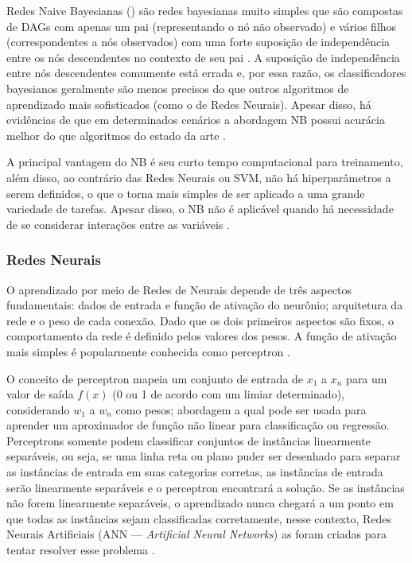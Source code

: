 \documentclass[
	12pt,				%
	oneside,			%
	a4paper,			%
	english,			%
	brazil				%
	]{abntex2ppgsi}
\begin{document}
{Redes Naive Bayesianas () são redes bayesianas muito simples que são compostas de DAGs com apenas um pai (representando o nó não observado) e vários filhos (correspondentes a nós observados) com uma forte suposição de independência entre os nós descendentes no contexto de seu pai \cite{kotsiantis2006machine}.  A suposição de independência entre nós descendentes comumente está errada e, por essa razão, os classificadores bayesianos geralmente são menos precisos do que outros algoritmos de aprendizado mais sofisticados (como o de Redes Neurais). Apesar disso, há evidências de que em determinados cenários a abordagem NB possui acurácia melhor do que algoritmos do estado da arte \cite{kotsiantis2006machine}.

A principal vantagem do NB é seu curto tempo computacional para treinamento, além disso, ao contrário das Redes Neurais ou SVM, não há hiperparâmetros a serem definidos, o que o torna mais simples de ser aplicado a uma grande variedade de tarefas. Apesar disso, o NB não é aplicável quando há necessidade de se considerar interações entre as variáveis \cite{kotsiantis2006machine, singh2016review}.

\subsubsection{Redes Neurais}

O aprendizado por meio de Redes de Neurais depende de três aspectos fundamentais: dados de entrada e função de ativação do neurônio; arquitetura da rede e o peso de cada conexão. Dado que os dois primeiros aspectos são fixos, o comportamento da rede é definido pelos valores  dos pesos. A função de ativação mais simples é popularmente conhecida como perceptron \cite{kotsiantis2006machine}.

O conceito de perceptron mapeia um conjunto de entrada de $x_1$ a $x_n$ para um valor de saída $f(x)$ (0 ou 1 de acordo com um limiar determinado), considerando $w_1$ a $w_n$ como pesos; abordagem a qual pode ser usada para aprender um aproximador de função não linear para classificação ou regressão. Perceptrons somente podem classificar conjuntos de instâncias linearmente separáveis, ou seja, se uma linha reta ou plano puder ser desenhado para separar as instâncias de entrada em suas categorias corretas, as instâncias de entrada serão linearmente separáveis e o perceptron encontrará a solução. Se as instâncias não forem linearmente separáveis, o aprendizado nunca chegará a um ponto em que todas as instâncias sejam classificadas corretamente, nesse contexto, Redes Neurais Artificiais (ANN --- \textit{Artificial Neural Networks}) as foram criadas para tentar resolver esse problema \cite{kotsiantis2006machine, singh2016review}. 

}
\end{document}
